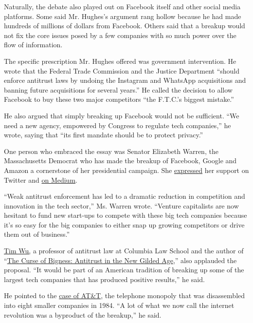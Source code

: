 Naturally, the debate also played out on Facebook itself and other
social media platforms. Some said Mr. Hughes's argument rang hollow
because he had made hundreds of millions of dollars from Facebook.
Others said that a breakup would not fix the core issues posed by a few
companies with so much power over the flow of information.

The specific prescription Mr. Hughes offered was government
intervention. He wrote that the Federal Trade Commission and the Justice
Department ``should enforce antitrust laws by undoing the Instagram and
WhatsApp acquisitions and banning future acquisitions for several
years.'' He called the decision to allow Facebook to buy these two major
competitors ``the F.T.C.'s biggest mistake.''

He also argued that simply breaking up Facebook would not be sufficient.
``We need a new agency, empowered by Congress to regulate tech
companies,'' he wrote, saying that ``its first mandate should be to
protect privacy.''

One person who embraced the essay was Senator Elizabeth Warren, the
Massachusetts Democrat who has made the breakup of Facebook, Google and
Amazon a cornerstone of her presidential campaign. She
\href{https://twitter.com/ewarren/status/1126493176406081537}{expressed}
her support on Twitter and
\href{https://medium.com/@teamwarren/heres-how-we-can-break-up-big-tech-9ad9e0da324c}{on
Medium}.

``Weak antitrust enforcement has led to a dramatic reduction in
competition and innovation in the tech sector,'' Ms. Warren wrote.
``Venture capitalists are now hesitant to fund new start-ups to compete
with these big tech companies because it's so easy for the big companies
to either snap up growing competitors or drive them out of business.''

\href{https://www.law.columbia.edu/faculty/timothy-wu}{Tim Wu,} a
professor of antitrust law at Columbia Law School and the author of
``\href{https://www.amazon.com/Curse-Bigness-Antitrust-New-Gilded/dp/0999745468}{The
Curse of Bigness: Antitrust in the New Gilded Age},'' also applauded the
proposal. ``It would be part of an American tradition of breaking up
some of the largest tech companies that has produced positive results,''
he said.

He pointed to the
\href{https://www.nytimes3xbfgragh.onion/1995/09/22/business/at-t-move-is-a-reversal-of-course-set-in-1980-s.html}{case
of AT\&T}, the telephone monopoly that was disassembled into eight
smaller companies in 1984. ``A lot of what we now call the internet
revolution was a byproduct of the breakup,'' he said.

